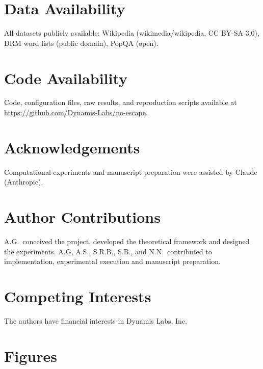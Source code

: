 \documentclass[11pt]{article}
\begin{document}
\section*{Data Availability}
All datasets publicly available: Wikipedia (wikimedia/wikipedia, CC BY-SA 3.0), DRM word lists (public domain\cite{roediger1995}), PopQA\cite{popqa} (open).

\section*{Code Availability}
Code, configuration files, raw results, and reproduction scripts available at \url{https://github.com/Dynamis-Labs/no-escape}.

\section*{Acknowledgements}
Computational experiments and manuscript preparation were assisted by Claude (Anthropic).

\section*{Author Contributions}
A.G.\ conceived the project, developed the theoretical framework and designed the experiments. A.G, A.S., S.R.B., S.B., and N.N.\ contributed to implementation, experimental execution and manuscript preparation.

\section*{Competing Interests}
The authors have financial interests in Dynamis Labs, Inc.




\clearpage
\section*{Figures}
\end{document}
